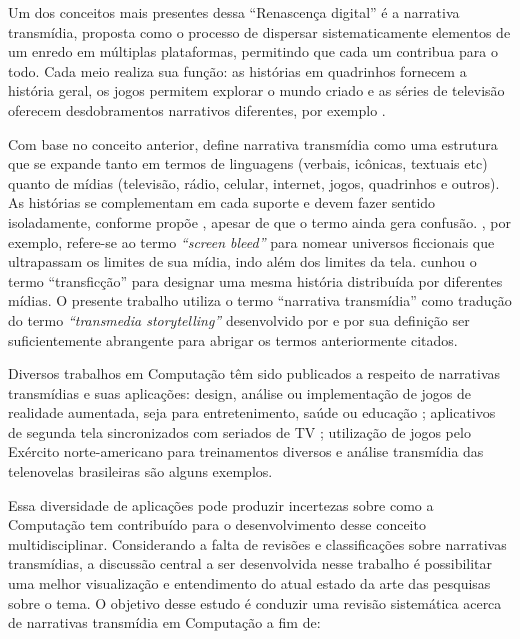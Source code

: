 \documentclass[
article,			%
11pt,				%
oneside,			%
a4paper,			%
english,			%
brazil,				%
sumario=tradicional
]{abntex2}
\begin{document}
  Um dos conceitos mais presentes dessa ``Renascença digital'' é a narrativa transmídia, proposta como o processo de dispersar sistematicamente elementos de um enredo em múltiplas plataformas, permitindo que cada um contribua para o todo. Cada meio realiza sua função: as histórias em quadrinhos fornecem a história geral, os jogos permitem explorar o mundo criado e as séries de televisão oferecem desdobramentos narrativos diferentes, por exemplo \cite{jenkins_fastcompany_2011}.

  Com base no conceito anterior,  define narrativa transmídia como uma estrutura que se expande tanto em termos de linguagens (verbais, icônicas, textuais etc) quanto de mídias (televisão, rádio, celular, internet, jogos, quadrinhos e outros). As histórias se complementam em cada suporte e devem fazer sentido isoladamente, conforme propõe , apesar de que o termo ainda gera confusão. , por exemplo, refere-se ao termo \textit{``screen bleed''} para nomear universos ficcionais que ultrapassam os limites de sua mídia, indo além dos limites da tela.  cunhou o termo ``transficção''  para  designar  uma  mesma  história  distribuída  por  diferentes  mídias. O presente trabalho utiliza o termo ``narrativa transmídia'' como tradução do termo \textit{``transmedia storytelling''} desenvolvido por  e por sua definição ser suficientemente abrangente para abrigar os termos anteriormente citados.

  Diversos trabalhos em Computação têm sido publicados a respeito de narrativas transmídias e suas aplicações: design, análise ou implementação de jogos de realidade aumentada, seja para entretenimento, saúde ou educação \cite{bonsignore_2012,evans_2014,johnston_2012,holler_2014}; aplicativos de segunda tela sincronizados com seriados de TV \cite{nandakumar_2014}; utilização de jogos pelo Exército norte-americano para treinamentos diversos \cite{raybourn_2014} e análise transmídia das telenovelas brasileiras \cite{murakami_2015} são alguns exemplos.

  Essa diversidade de aplicações pode produzir incertezas sobre como a Computação tem contribuído para o desenvolvimento desse conceito multidisciplinar. Considerando a falta de revisões e classificações sobre narrativas transmídias, a discussão central a ser desenvolvida nesse trabalho é possibilitar uma melhor visualização e entendimento do atual estado da arte das pesquisas sobre o tema.  O objetivo desse estudo é conduzir uma revisão sistemática acerca de narrativas transmídia em Computação a fim de:
\end{document}
